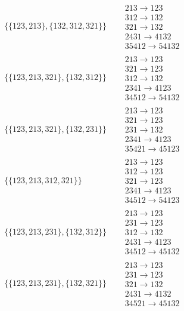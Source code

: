 \begin{tiny}
\begin{align}
\begin{matrix}
\end{matrix}
\\
\{\{123, 213\}, \{132, 312, 321\}\}
\quad
&
\begin{matrix}
213 \to 123\\312 \to 132\\321 \to 132\\2431 \to 4132\\35412 \to 54132
\end{matrix}
\\
\{\{123, 213, 321\}, \{132, 312\}\}
\quad
&
\begin{matrix}
213 \to 123\\321 \to 123\\312 \to 132\\2341 \to 4123\\34512 \to 54132
\end{matrix}
\\
\{\{123, 213, 321\}, \{132, 231\}\}
\quad
&
\begin{matrix}
213 \to 123\\321 \to 123\\231 \to 132\\2341 \to 4123\\35421 \to 45123
\end{matrix}
\\
\{\{123, 213, 312, 321\}\}
\quad
&
\begin{matrix}
213 \to 123\\312 \to 123\\321 \to 123\\2341 \to 4123\\34512 \to 54123
\end{matrix}
\\
\{\{123, 213, 231\}, \{132, 312\}\}
\quad
&
\begin{matrix}
213 \to 123\\231 \to 123\\312 \to 132\\2431 \to 4123\\34512 \to 45132
\end{matrix}
\\
\{\{123, 213, 231\}, \{132, 321\}\}
\quad
&
\begin{matrix}
213 \to 123\\231 \to 123\\321 \to 132\\2431 \to 4132\\34521 \to 45132
\end{matrix}
\\

\end{align}
\end{tiny}

